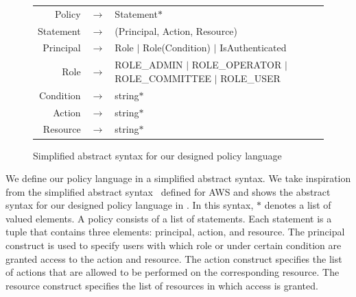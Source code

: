 \begin{figure} [btp]
  \small
  \begin{tabular}{rcp{5cm}}
    Policy \hspace*{-3ex}    & $\rightarrow$ & \hspace*{-3ex} Statement$*$                                                      \\
    Statement \hspace*{-3ex} & $\rightarrow$ & \hspace*{-3ex} (Principal, Action, Resource)                                     \\
    Principal \hspace*{-3ex} & $\rightarrow$ & \hspace*{-3ex} Role $|$ Role(Condition) $|$ IsAuthenticated                      \\
    Role \hspace*{-3ex}      & $\rightarrow$ & \hspace*{-3ex} ROLE\_ADMIN $|$ ROLE\_OPERATOR $|$ ROLE\_COMMITTEE $|$ ROLE\_USER \\
    Condition \hspace*{-3ex} & $\rightarrow$ & \hspace*{-3ex} string$*$                                                         \\
    Action \hspace*{-3ex}    & $\rightarrow$ & \hspace*{-3ex} string$*$                                                         \\
    Resource \hspace*{-3ex}  & $\rightarrow$ & \hspace*{-3ex} string$*$                                                         \\
  \end{tabular}
  \caption{Simplified abstract syntax for our designed policy language}
  \label{fig:dsl}
\end{figure}

We define our policy language in a simplified abstract syntax.
%
We take inspiration from the simplified abstract
syntax~\cite{Backes+etal:2018:Zelkova} defined for AWS and shows the abstract
syntax for our designed policy language in .
%
In this syntax, $*$ denotes a list of valued elements.
%
A policy consists of a list of statements.
%
Each statement is a tuple that contains three elements: principal, action, and
resource.
%
The principal construct is used to specify users with which role or under
certain condition are granted access to the action and resource.
%
The action construct specifies the list of actions that are allowed to be
performed on the corresponding resource.
%
The resource construct specifies the list of resources in which access is
granted.

